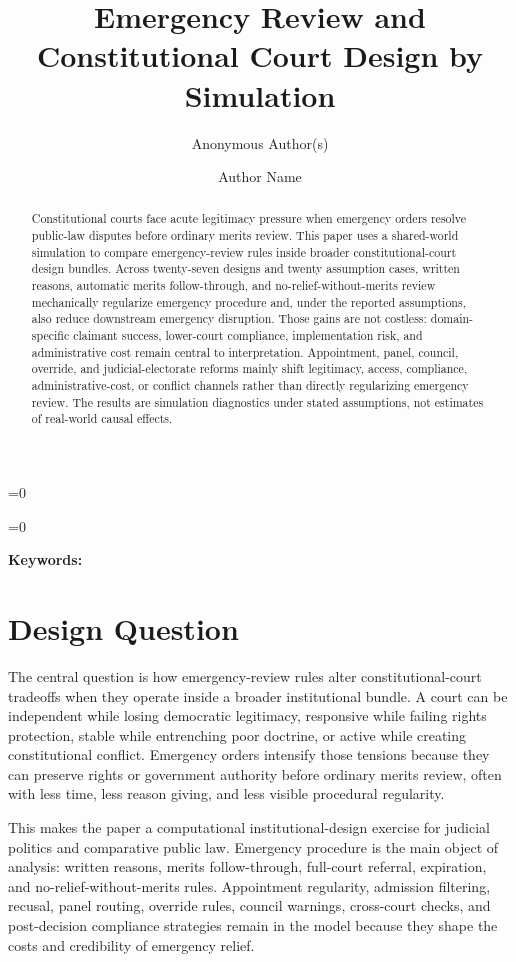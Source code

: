 \documentclass[
    journal=jlc,
    manuscript=research-article,
    year=2026,
  ]{cup-journal}
\title{Emergency Review and Constitutional Court Design by Simulation}
\date{}
\author{Anonymous Author(s)}
\affiliation{Affiliation suppressed for anonymous review}
\author{Author Name}
\affiliation{Author Affiliation}
\def\paperusescup{1}
\def\paperusescup{0}
\providecommand{\printkeywords}{\par\noindent\textbf{Keywords:} \paperkeywords\par}
\begin{document}
\ifnum\paperusescup=0
  \maketitle
\fi

\begin{abstract}
Constitutional courts face acute legitimacy pressure when emergency orders resolve public-law disputes before ordinary merits review. This paper uses a shared-world simulation to compare emergency-review rules inside broader constitutional-court design bundles. Across twenty-seven designs and twenty assumption cases, written reasons, automatic merits follow-through, and no-relief-without-merits review mechanically regularize emergency procedure and, under the reported assumptions, also reduce downstream emergency disruption. Those gains are not costless: domain-specific claimant success, lower-court compliance, implementation risk, and administrative cost remain central to interpretation. Appointment, panel, council, override, and judicial-electorate reforms mainly shift legitimacy, access, compliance, administrative-cost, or conflict channels rather than directly regularizing emergency review. The results are simulation diagnostics under stated assumptions, not estimates of real-world causal effects.
\end{abstract}

\ifnum\paperusescup=0
  \printkeywords
\fi

\section{Design Question}

The central question is how emergency-review rules alter constitutional-court tradeoffs when they operate inside a broader institutional bundle. A court can be independent while losing democratic legitimacy, responsive while failing rights protection, stable while entrenching poor doctrine, or active while creating constitutional conflict. Emergency orders intensify those tensions because they can preserve rights or government authority before ordinary merits review, often with less time, less reason giving, and less visible procedural regularity.

This makes the paper a computational institutional-design exercise for judicial politics and comparative public law. Emergency procedure is the main object of analysis: written reasons, merits follow-through, full-court referral, expiration, and no-relief-without-merits rules. Appointment regularity, admission filtering, recusal, panel routing, override rules, council warnings, cross-court checks, and post-decision compliance strategies remain in the model because they shape the costs and credibility of emergency relief.
\end{document}
